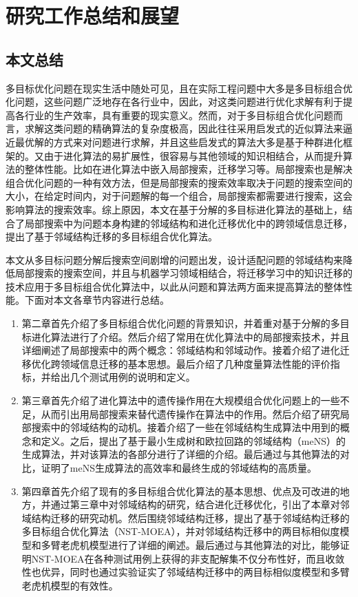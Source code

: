 \chapter{研究工作总结和展望}
\label{chap:conclusion}
\section{本文总结}
\label{sec:conclusion}
多目标优化问题在现实生活中随处可见，且在实际工程问题中大多是多目标组合优化问题，这些问题广泛地存在各行业中，因此，对这类问题进行优化求解有利于提高各行业的生产效率，具有重要的现实意义。然而，对于多目标组合优化问题而言，求解这类问题的精确算法的复杂度极高，因此往往采用启发式的近似算法来逼近最优解的方式来对问题进行求解，并且这些启发式的算法大多是基于种群进化框架的。又由于进化算法的易扩展性，很容易与其他领域的知识相结合，从而提升算法的整体性能。比如在进化算法中嵌入局部搜索，迁移学习等。局部搜索也是解决组合优化问题的一种有效方法，但是局部搜索的搜索效率取决于问题的搜索空间的大小，在给定时间内，对于问题解的每一个组合，局部搜索都需要进行搜索，这会影响算法的搜索效率。综上原因，本文在基于分解的多目标进化算法的基础上，结合了局部搜索中为问题本身构建的邻域结构和进化迁移优化中的跨领域信息迁移，提出了基于邻域结构迁移的多目标组合优化算法。
\par
本文从多目标问题分解后搜索空间剧增的问题出发，设计适配问题的邻域结构来降低局部搜索的搜索空间，并且与机器学习领域相结合，将迁移学习中的知识迁移的技术应用于多目标组合优化算法中，以此从问题和算法两方面来提高算法的整体性能。下面对本文各章节内容进行总结。
\begin{enumerate}
    \item 第二章首先介绍了多目标组合优化问题的背景知识，并着重对基于分解的多目标进化算法进行了介绍。然后介绍了常用在优化算法中的局部搜索技术，并且详细阐述了局部搜索中的两个概念：邻域结构和邻域动作。接着介绍了进化迁移优化跨领域信息迁移的基本思想。最后介绍了几种度量算法性能的评价指标，并给出几个测试用例的说明和定义。
    \item 第三章首先介绍了进化算法中的遗传操作用在大规模组合优化问题上的一些不足，从而引出用局部搜索来替代遗传操作在算法中的作用。然后介绍了研究局部搜索中的邻域结构的动机。接着介绍了一些在邻域结构生成算法中用到的概念和定义。之后，提出了基于最小生成树和欧拉回路的邻域结构（meNS）的生成算法，并对该算法的各部分进行了详细的介绍。最后通过与其他算法的对比，证明了meNS生成算法的高效率和最终生成的邻域结构的高质量。
    \item 第四章首先介绍了现有的多目标组合优化算法的基本思想、优点及可改进的地方，并通过第三章中对邻域结构的研究，结合进化迁移优化，引出了本章对邻域结构迁移的研究动机。然后围绕邻域结构迁移，提出了基于邻域结构迁移的多目标组合优化算法（NST-MOEA），并对邻域结构迁移中的两目标相似度模型和多臂老虎机模型进行了详细的阐述。最后通过与其他算法的对比，能够证明NST-MOEA在各种测试用例上获得的非支配解集不仅分布性好，而且收敛性也优异，同时也通过实验证实了邻域结构迁移中的两目标相似度模型和多臂老虎机模型的有效性。
\end{enumerate}

